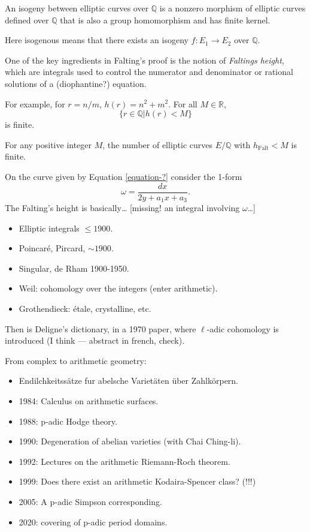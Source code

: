 \begin{definition}
\label{definition-isogeny}
An isogeny between elliptic curves over
$\mathbb{Q}$ is a nonzero morphism of
elliptic curves defined over $\mathbb{Q}$
that is also a group homomorphism and has
finite kernel.
\end{definition}

Here isogenous means that there exists an
isogeny $f:E_1 \to E_2$ over $\mathbb{Q}$.

\medskip\noindent
One of the key ingredients
in Falting's proof
is the notion of {\it Faltings height},
which are integrals used to
control the numerator and denominator
or rational solutions of a (diophantine?)
equation.

For example, for $r = n/m$,
$h(r)=n^2+m^2$. For all $M \in \mathbb{R}$,
$$
\{r \in \mathbb{Q}| h(r)<M\}
$$
is finite.

\begin{proposition}
\label{proposition-faltings-height}
For any positive integer $M$,
the number of elliptic curves $E/\mathbb{Q}$
with $h_{\text{Falt}}<M$ is finite.
\end{proposition}

\noindent
On the curve given by Equation
\ref{equation-?}
consider the 1-form
$$
\omega=\frac{dx}{2y+a_1x+a_3}.
$$
The Falting's height is basically…
[missing! an integral involving $\omega$…]

\medskip\noindent
\begin{itemize}
\item Elliptic integrals $\leq 1900$.
\item Poincaré, Pircard, $\sim 1900$.
\item Singular, de Rham 1900-1950.
\item Weil: cohomology over the integers
(enter arithmetic).
\item Grothendieck: étale, crystalline, etc.
\end{itemize}

\noindent
Then is Deligne's dictionary,
in a 1970 paper, where $\ell$-adic
cohomology is introduced
(I think --- abstract in french, check).

\medskip\noindent
From complex to arithmetic geometry:

\begin{itemize}
\item Endilchkeitssätze
fur abelsche Varietäten über Zahlkörpern.
\item 1984: Calculus on arithmetic surfaces.
\item 1988: p-adic Hodge theory.
\item 1990: Degeneration of abelian
varieties (with Chai Ching-li).
\item 1992: Lectures on the
arithmetic Riemann-Roch theorem.
\item 1999: Does there exist an arithmetic
Kodaira-Spencer class? (!!!)
\item 2005: A p-adic Simpson corresponding.
\item 2020: covering of p-adic period
domains.
\end{itemize}

